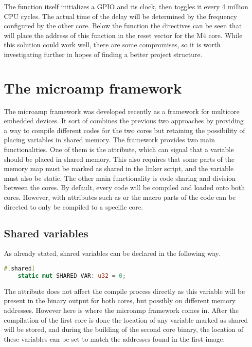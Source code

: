 The function itself initializes a GPIO and its clock, then toggles it every 4 million CPU cycles. The actual time of the delay will be determined by the frequency configured by the other core. Below the function the directives can be seen that will place the address of this function in the reset vector for the M4 core. While this solution could work well, there are some compromises, so it is worth investigating further in hopes of finding a better project structure.

\section{The microamp framework}

The microamp framework was developed recently as a framework for multicore embedded devices. It sort of combines the previous two approaches by providing a way to compile different codes for the two cores but retaining the possibility of placing variables in shared memory. The framework provides two main functionalities. One of them is the \mycode{#[shared]} attribute, which can signal that a variable should be placed in shared memory. This also requires that some parts of the memory map must be marked as shared in the linker script, and the variable must also be static. The other main functionality is code sharing and division between the cores. By default, every code will be compiled and loaded onto both cores. However, with attributes such as \mycode{#[cfg(core = "0")]} or the  macro parts of the code can be directed to only be compiled to a specific core.

\subsection{Shared variables}

As already stated, shared variables can be declared in the following way.

\begin{lstlisting}[language=Rust,frame=single,float=!ht,style=customrust,label={lst:shared-variable},caption={Shared Variable Example}]
    #[shared]
    static mut SHARED_VAR: u32 = 0;
\end{lstlisting}

The attribute does not affect the compile process directly as this variable will be present in the binary output for both cores, but possibly on different memory addresses. However here is where the microamp framework comes in. After the compilation of the first core is done the location of any variable marked as shared will be stored, and during the building of the second core binary, the location of these variables can be set to match the addresses found in the first image.


